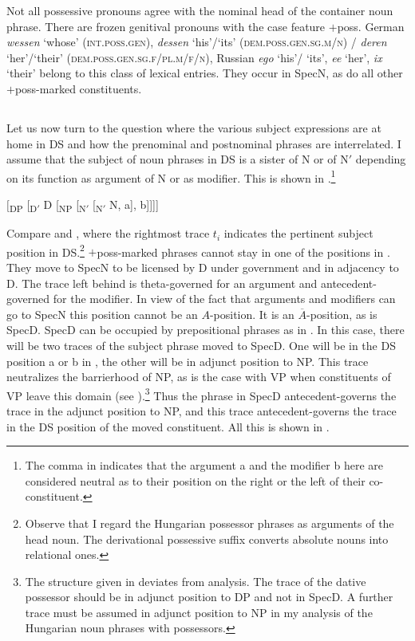 \documentclass[output=paper,colorlinks,citecolor=brown]{langscibook}
\begin{document}
Not all possessive pronouns agree with the nominal head of the container noun phrase. There are frozen genitival pronouns with the case feature $+$poss. German \textit{wessen} ‘whose' (\textsc{int}.\textsc{poss}.\textsc{gen}), \textit{dessen} ‘his'/‘its' (\textsc{dem}.\textsc{poss}.\textsc{gen}.\textsc{sg}.\textsc{m/n})  / \textit{deren} ‘her'/‘their' (\textsc{dem}.\textsc{poss}.\textsc{gen}.\textsc{sg}.\textsc{f}/\textsc{pl}.\textsc{m/f/n}), Russian \textit{ego} `his'/
`its', \textit{ee} `her', \textit{ix} `their' belong to this class of lexical entries. They occur in SpecN, as do all other $+$poss-marked constituents.

\subsection{} \label{sec:zi91:5.3}

Let us now turn to the question where the various subject expressions are at home in DS and how the prenominal and postnominal phrases are interrelated. I assume that the subject of noun phrases in DS is a sister of N or of N$'$ depending on its function as argument of N or as modifier. This is shown in .\footnote{The comma in  indicates that the argument a and the modifier b here are considered neutral as to their position on the right or the left of their co-constituent.}

\ea \label{ex:zi91:58} $[$\textsubscript{DP} [\textsubscript{D$'$} D [\textsubscript{NP} [\textsubscript{N$'$} [\textsubscript{N$'$} N, a], b]]]]
\z

\noindent Compare  and , where the rightmost trace $t_{i}$ indicates the pertinent subject position in DS.\footnote{Observe that I regard the Hungarian possessor phrases as arguments of the head noun. The derivational possessive suffix converts absolute nouns into relational ones.} $+$poss-marked phrases cannot stay in one of the positions in . They move to SpecN to be licensed by D under government and in adjacency to D. The trace left behind is theta-governed for an argument and antecedent-governed for the modifier. In view of the fact that arguments and modifiers can go to SpecN this position cannot be an $A$-position. It is an $\overline{A}$-position, as is SpecD. SpecD can be occupied by prepositional phrases as in . In this case, there will be two traces of the subject phrase moved to SpecD. One will be in the DS position a or b in , the other will be in adjunct position to NP. This trace neutralizes the barrierhood of NP, as is the case with VP when constituents of VP leave this domain (see \citealt{Chomsky86Barriers, Chomsky89Some-notes}).\footnote{The structure given in  deviates from  analysis. The trace of the dative possessor should be in adjunct position to DP and not in SpecD. A further trace must be assumed in adjunct position to NP in my analysis of the Hungarian noun phrases with possessors.} Thus the phrase in SpecD antecedent-governs the trace in the adjunct position to NP, and this trace antecedent-governs the trace in the DS position of the moved constituent. All this is shown in .
\end{document}
